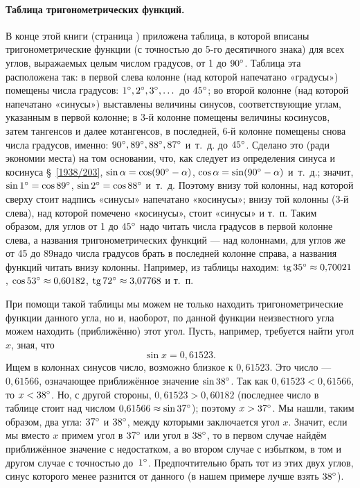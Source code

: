 \documentclass[oneside]{book}
\begin{document}
\paragraph{Таблица тригонометрических функций.}\label{1938/206} %
В конце этой книги (страница \pageref{trig-tablitza})
приложена таблица, в которой вписаны тригонометрические функции (с точностью до 5-го десятичного знака) для всех углов, выражаемых целым числом градусов, от 1 до $90\degree$.
Таблица эта расположена так:
в первой слева колонне (над которой напечатано «градусы») помещены числа градусов:
$1\degree, 2\degree, 3\degree,\dots$ до $45\degree$;
во второй колонне (над которой напечатано «синусы») выставлены величины синусов, соответствующие углам, указанным в первой колонне;
в 3-й колонне помещены величины косинусов, затем тангенсов и далее котангенсов, в последней, 6-й колонне помещены снова числа градусов, именно:
$90\degree, 89\degree , 88\degree , 87\degree$ и~т.~д.
до $45\degree$.
Сделано это (ради экономии места) на том основании, что, как следует из определения синуса и косинуса §~\ref{1938/203}, $\sin\alpha=\cos(90\degree-\alpha)$, $\cos\alpha=\sin(90\degree-\alpha)$ и~т.~д.;
значит, $\sin1\degree = \cos 89\degree$, $\sin 2\degree = \cos 88\degree$ и~т.~д.
Поэтому внизу той колонны, над которой сверху стоит надпись «синусы» напечатано «косинусы»;
внизу той колонны (3-й слева), над которой помечено «косинусы», стоит «синусы» и т.~п.
Таким образом, для углов от 1 до $45\degree$ надо читать числа градусов в первой колонне слева, а названия тригонометрических функций — над колоннами, для углов же от 45 до 89\degree надо числа градусов брать в последней колонне справа, а названия функций читать внизу колонны.
Например, из таблицы находим:
$\mathrm{tg}\,35\degree \approx 0{,}70021$, 
$\cos 53\degree \approx 0{,}60182$, 
$\mathrm{tg}\,72\degree \approx 3{,}07768$ и т.~п.

При помощи такой таблицы мы можем не только %
находить тригонометрические функции данного угла, но и, наоборот, по данной функции неизвестного угла можем находить (приближённо) этот угол.
Пусть, например, требуется найти угол $x$, зная, что \[\sin x = 0{,}61523.\]
Ищем в колоннах синусов число, возможно близкое к $0{,}61523$.
Это число — $0{,}61566$, означающее приближённое значение $\sin38\degree$.
Так как $0{,}61523<0{,}61566$, то $x < 38\degree$.
Но, с другой стороны, $0{,}61523>0{,}60182$ (последнее число в таблице стоит над числом $0{,}61566\approx\sin37\degree$);
поэтому $x > 37\degree$.
Мы нашли, таким образом, два угла:
$37\degree$ и $38\degree$, между которыми заключается угол $x$.
Значит, если мы вместо $x$ примем угол в $37\degree$ или угол в $38\degree$, то в первом случае найдём приближённое значение с недостатком, а во втором случае с избытком, в том и другом случае с точностью до~$1\degree$.
Предпочтительно брать тот из этих двух углов, синус которого менее разнится от данного (в нашем примере лучше взять $38\degree$).
\end{document}
